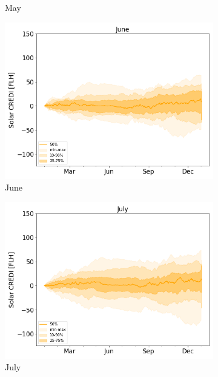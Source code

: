 \documentclass[a4paper,11pt]{extarticle}
\begin{document}
\begin{figure}[t]
\begin{subfigure}[t]{0.32\linewidth}
    \caption{May }
\end{subfigure}
\begin{subfigure}[t]{0.32\linewidth}
    \includegraphics[width=\linewidth]{Fig_CUMSUM_YearStart_SPV_June}
    \caption{June }
\end{subfigure}
\begin{subfigure}[t]{0.32\linewidth}
    \includegraphics[width=\linewidth]{Fig_CUMSUM_YearStart_SPV_July}
    \caption{July }
\end{subfigure}
\begin{subfigure}[t]{0.32\linewidth}

\end{subfigure}
\end{figure}
\end{document}
